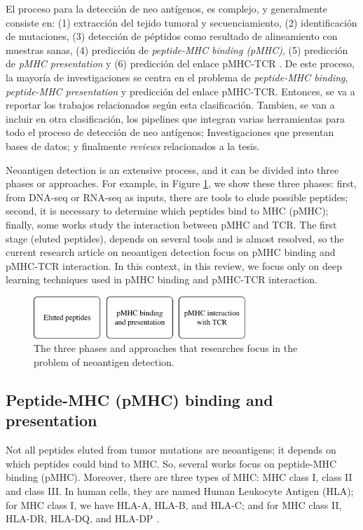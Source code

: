  El proceso para la detección de neo antígenos, es complejo, y generalmente consiste en: (1) extracción del tejido tumoral y secuenciamiento, (2) identificación de mutaciones, (3) detección de péptidos como resultado de alineamiento con muestras sanas, (4) predicción de \textit{peptide-MHC binding (pMHC)}, (5) predicción de \textit{pMHC presentation} y (6) predicción del enlace pMHC-TCR \citep{de2020neoantigen, peng2019neoantigen}. De este proceso, la mayoría de investigaciones se centra en el problema de \textit{peptide-MHC binding}, \textit{peptide-MHC presentation} y predicción del enlace pMHC-TCR. Entonces, se va a reportar los trabajos relacionados según esta clasificación. Tambien, se van a incluir en otra clasificación, los pipelines que integran varias herramientas para todo el proceso de detección de neo antígenos; Investigaciones que presentan bases de datos; y finalmente \textit{reviews} relacionados a la tesis.



Neoantigen detection is an extensive process, and it can be divided into three phases or approaches. For example, in Figure \ref{fig:approaches}, we show these three phases:  first, from DNA-seq or RNA-seq as inputs, there are tools to elude possible peptides; second, it is necessary to determine which peptides bind to MHC (pMHC); finally, some works study the interaction between pMHC and TCR. The first stage (eluted peptides), depends on several tools and is almost resolved, so the current research article on neoantigen detection focus on pMHC binding and pMHC-TCR interaction. In this context, in this review, we focus only on deep learning techniques used in pMHC binding and pMHC-TCR interaction.

\begin{figure}[h]
	\centering
	\includegraphics[width=8cm]{img/approaches} 
	\caption{The three phases and approaches that researches focus in the problem of neoantigen detection.}
	\label{fig:approaches}
\end{figure}


\subsection{Peptide-MHC (pMHC) binding and presentation}

Not all peptides eluted from tumor mutations are neoantigens; it depends on which peptides could bind to MHC. So, several works focus on peptide-MHC binding (pMHC). Moreover, there are three types of MHC: MHC class I, class II and class III. In human cells, they are named Human Leukocyte Antigen (HLA); for MHC class I, we have HLA-A, HLA-B, and HLA-C; and for MHC class II, HLA-DR, HLA-DQ, and HLA-DP \cite{neefjes2011towards}. \\

